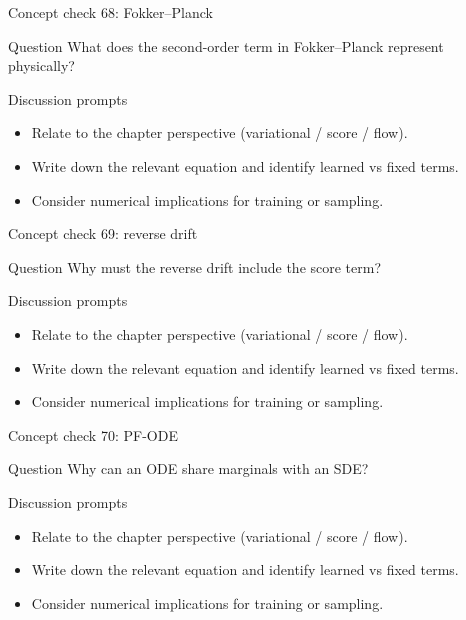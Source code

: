 \documentclass[aspectratio=169]{beamer}
\begin{document}
\begin{frame}{Concept check 68: Fokker--Planck}
\begin{block}{Question}
What does the second-order term in Fokker--Planck represent physically?
\end{block}
\begin{block}{Discussion prompts}
\begin{itemize}
\item Relate to the chapter perspective (variational / score / flow).
\item Write down the relevant equation and identify learned vs fixed terms.
\item Consider numerical implications for training or sampling.
\end{itemize}
\end{block}
\end{frame}

\begin{frame}{Concept check 69: reverse drift}
\begin{block}{Question}
Why must the reverse drift include the score term?
\end{block}
\begin{block}{Discussion prompts}
\begin{itemize}
\item Relate to the chapter perspective (variational / score / flow).
\item Write down the relevant equation and identify learned vs fixed terms.
\item Consider numerical implications for training or sampling.
\end{itemize}
\end{block}
\end{frame}

\begin{frame}{Concept check 70: PF-ODE}
\begin{block}{Question}
Why can an ODE share marginals with an SDE?
\end{block}
\begin{block}{Discussion prompts}
\begin{itemize}
\item Relate to the chapter perspective (variational / score / flow).
\item Write down the relevant equation and identify learned vs fixed terms.
\item Consider numerical implications for training or sampling.
\end{itemize}
\end{block}
\end{frame}
\end{document}
